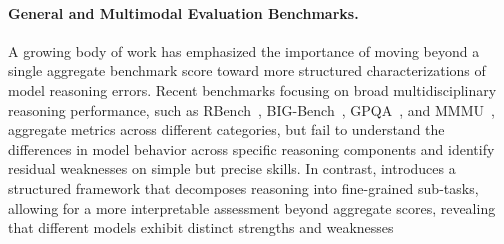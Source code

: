 
\paragraph{General and Multimodal Evaluation Benchmarks.}
A growing body of work has emphasized the importance of moving beyond a single aggregate benchmark score toward more structured characterizations of model reasoning errors. Recent benchmarks focusing on broad multidisciplinary reasoning performance, such as RBench~\cite{rbench_2025}, BIG-Bench~\cite{srivastava2023beyond}, GPQA~\cite{gpqa_bench}, and MMMU~\cite{mmmu_bench}, aggregate metrics across different categories, but fail to understand the differences in model behavior across specific reasoning components and identify residual weaknesses on simple but precise skills. In contrast, \bench introduces a structured framework that decomposes reasoning into fine-grained sub-tasks, allowing for a more interpretable assessment beyond aggregate scores, revealing that different models exhibit distinct strengths and weaknesses


